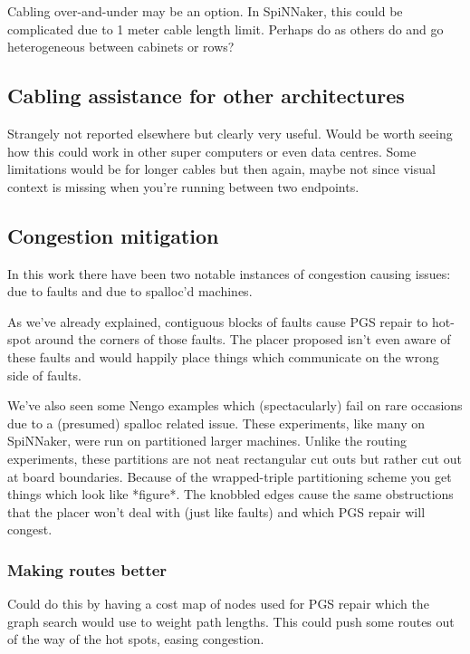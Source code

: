 			Cabling over-and-under may be an option. In SpiNNaker, this could be
			complicated due to 1 meter cable length limit. Perhaps do as others do and
			go heterogeneous between cabinets or rows?
		
		\subsection{Cabling assistance for other architectures}
			
			Strangely not reported elsewhere but clearly very useful. Would be worth
			seeing how this could work in other super computers or even data centres.
			Some limitations would be for longer cables but then again, maybe not since
			visual context is missing when you're running between two endpoints.
		
		\subsection{Congestion mitigation}
			
			In this work there have been two notable instances of congestion causing
			issues: due to faults and due to spalloc'd machines.
			
			As we've already explained, contiguous blocks of faults cause PGS repair to
			hot-spot around the corners of those faults. The placer proposed isn't even
			aware of these faults and would happily place things which communicate on
			the wrong side of faults.
			
			\label{sec:wiggly-board-allocations}
			
			We've also seen some Nengo examples which (spectacularly) fail on rare
			occasions due to a (presumed) spalloc related issue. These experiments,
			like many on SpiNNaker, were run on partitioned larger machines. Unlike the
			routing experiments, these partitions are not neat rectangular cut outs but
			rather cut out at board boundaries. Because of the wrapped-triple
			partitioning scheme you get things which look like *figure*. The knobbled
			edges cause the same obstructions that the placer won't deal with (just
			like faults) and which PGS repair will congest.
			
			\subsubsection{Making routes better}
				
				Could do this by having a cost map of nodes used for PGS repair which the
				graph search would use to weight path lengths. This could push some
				routes out of the way of the hot spots, easing congestion.
			
